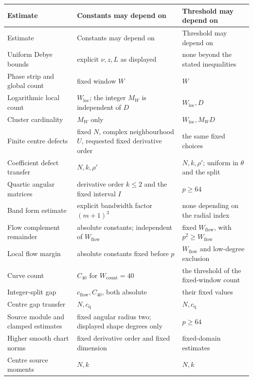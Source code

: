 \begingroup\small
\renewcommand{\arraystretch}{1.2}
\begin{longtable}{@{}>{\raggedright\arraybackslash}p{}>{\raggedright\arraybackslash}p{}>{\raggedright\arraybackslash}p{}@{}}
\toprule Estimate & Constants may depend on & Threshold may depend on\\\midrule
\endfirsthead
\toprule Estimate & Constants may depend on & Threshold may depend on\\\midrule
\endhead
Uniform Debye bounds & explicit $\nu,z,L$ as displayed & none beyond the stated inequalities\\
Phase strip and global count & fixed window $W$ & $W$\\
Logarithmic local count & $W_{\mathrm{loc}}$; the integer $M_W$ is independent of $D$ & $W_{\mathrm{loc}},D$\\
Cluster cardinality & $M_W$ only & $W_{\mathrm{loc}},M_WD$\\
Finite centre defects & fixed $N$, complex neighbourhood $U$, requested fixed derivative order & the same fixed choices\\
Coefficient defect transfer & $N,k,\rho'$ & $N,k,\rho'$; uniform in $\theta$ and the split\\
Quartic angular matrices & derivative order $k\le2$ and the fixed interval $I$ & $p\ge64$\\
Band form estimate & explicit bandwidth factor $(m+1)^3$ & none depending on the radial index\\
Flow complement remainder & absolute constants; independent of $W_{\mathrm{flow}}$ & fixed $W_{\mathrm{flow}}$, with $p^2\ge W_{\mathrm{flow}}$\\
Local flow margin & absolute constants fixed before $p$ & $W_{\mathrm{flow}}$ and low-degree exclusion\\
Curve count & $C_{40}$ for $W_{\mathrm{count}}=40$ & the threshold of the fixed-window count\\
Integer-split gap & $c_{\mathrm{flow}},C_{40}$, both absolute & their fixed values\\
Centre gap transfer & $N,c_{\mathrm q}$ & $N,c_{\mathrm q}$\\
Source module and clamped estimates & fixed angular radius two; displayed shape degrees only & $p\ge64$\\
Higher smooth chart norms & fixed derivative order and fixed dimension & fixed-domain estimates\\
Centre source moments & $N,k$ & $N,k$\\

\end{longtable}

